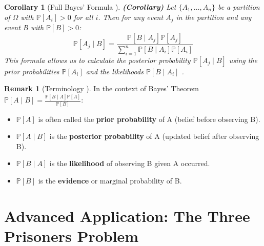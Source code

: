 \documentclass[12pt, a4paper]{article}
\theoremstyle{definition}
\newtheorem{remark}{Remark}[section]
\theoremstyle{plain}
\newtheorem{corollary}{Corollary}[section]
\newcommand{\Prob}[1]{\mathbb{P}\left[#1\right]} %
\newcommand{\condProb}[2]{\mathbb{P}\left[#1 \mid #2\right]} %
\newcommand{\samplespace}{\Omega} %
\begin{document}
\begin{corollary}[Full Bayes' Formula \cite{Ross, Chan, FacultyNotes}]
\textbf{(Corollary)} Let $\{A_1, \dots, A_n\}$ be a partition of $\samplespace$ with $\Prob{A_i} > 0$ for all $i$. Then for any event $A_j$ in the partition and any event B with $\Prob{B}>0$:
\[ \condProb{A_j}{B} = \frac{\condProb{B}{A_j}\Prob{A_j}}{\sum_{i=1}^{n} \condProb{B}{A_i}\Prob{A_i}} \]
This formula allows us to calculate the posterior probability $\condProb{A_j}{B}$ using the prior probabilities $\Prob{A_i}$ and the likelihoods $\condProb{B}{A_i}$ \cite{Ross, Chan}.
\end{corollary}

\begin{remark}[Terminology \cite{Chan}]
In the context of Bayes' Theorem $\condProb{A}{B} = \frac{\condProb{B}{A}\Prob{A}}{\Prob{B}}$:
\begin{itemize}
    \item $\Prob{A}$ is often called the \textbf{prior probability} of A (belief before observing B).
    \item $\condProb{A}{B}$ is the \textbf{posterior probability} of A (updated belief after observing B).
    \item $\condProb{B}{A}$ is the \textbf{likelihood} of observing B given A occurred.
    \item $\Prob{B}$ is the \textbf{evidence} or marginal probability of B.
\end{itemize}
\end{remark}

\section{Advanced Application: The Three Prisoners Problem}
\end{document}
